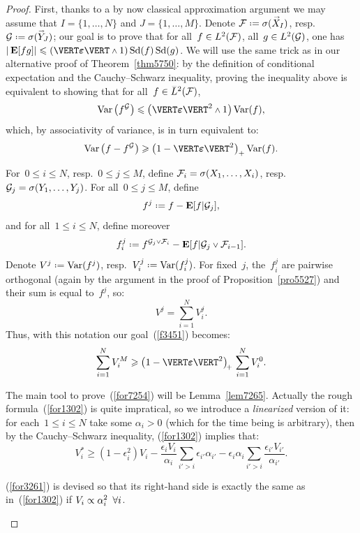 \begingroup{}\begin{proof}
First, thanks to a by now classical approximation argument
we may assume that $I = \{1,\ldots,N\}$
and $J = \{1,\ldots,M\}$. Denote $\mcal{F} \coloneqq \sigma(\vec{X}_I)$,
resp.\ $\mcal{G} \coloneqq \sigma(\vec{Y}_J)$; our goal is to prove
that for all~$f\in\ldb(\mcal{F})$, all~$g\in\ldb(\mcal{G})$,
one has $|\EE[fg]| \leq ( \VERT \boldepsilon \VERT \wedge 1 ) \ecty(f) \ecty(g)$.
We will use the same trick as in our alternative proof of Theorem~\ref{thm5750}:
by the definition of conditional expectation and the Cauchy--Schwarz inequality,
proving the inequality above is equivalent to showing that for all~$f\in\ldb(\mcal{F})$,
\[ \Var\big( f^{\mcal{G}} \big) \leq \big( \VERT \boldepsilon \VERT^2 \wedge 1 \big) \Var(f) ,\]
which, by associativity of variance, is in turn equivalent to:
\[\label{f3451}
\Var\big( f - f^{\mcal{G}} \big) \geq \big( 1-\VERT\boldepsilon\VERT^2 \big)_+ \Var(f) .\]

For~$0\leq i\leq N$, resp.~$0\leq j\leq M$, define
$\mathcal{F}_i = \sigma(X_1,\ldots,X_i)$, resp. $\mathcal{G}_j = \sigma(Y_1,\ldots,Y_j)$.
For all~$0 \leq j \leq M$, define
\[ f^j \coloneqq f - \EE[f|\mcal{G}_j] ,\]
and for all~$1 \leq i \leq N$, define moreover
\[ f^j_i \coloneqq f^{\mcal{G}_j\vee\mcal{F}_i} - \EE[f|\mcal{G}_j\vee\mcal{F}_{i-1}] .\]
Denote $V^j \coloneqq \Var(f^j)$, resp.\ $V^j_i \coloneqq \Var(f^j_i)$.
For fixed~$j$, the~$f^j_i$ are pairwise orthogonal
(again by the argument in the proof of Proposition~\ref{pro5527})
and their sum is equal to~$f^j$, so:
\[\label{for3043} V^j = \sum_{i=1}^N V^j_i .\]
Thus, with this notation our goal~(\ref{f3451}) becomes:
\[\label{for7254}
\sum_{i=1}^N V^M_i \geq \big( 1-\VERT\boldepsilon\VERT^2 \big)_{\!+\,} \sum_{i=1}^N V^0_i .\]

The main tool to prove~(\ref{for7254}) will be Lemma~\ref{lem7265}.
Actually the rough formula~(\ref{for1302}) is quite impratical,
so we introduce a \emph{linearized} version of it:
for each~$1\leq i\leq N$ take some $\alpha_i > 0$
(which for the time being is arbitrary), then by the Cauchy--Schwarz inequality,
(\ref{for1302}) implies that:
\[\label{for3261}
V^*_i \geq (1-\epsilon_i^2) V_i - \frac{\epsilon_i V_i}{\alpha_i} \sum_{i'>i} \epsilon_{i'}\alpha_{i'}
- \epsilon_i\alpha_i \sum_{i'>i} \frac{\epsilon_{i'}V_{i'}}{\alpha_{i'}} .\]

\begin{Rmk}
(\ref{for3261}) is devised so that its right-hand side is exactly the same
as in~(\ref{for1302}) if $V_i \propto \alpha_i^2\enskip\forall i$.
\end{Rmk}


\end{proof}
